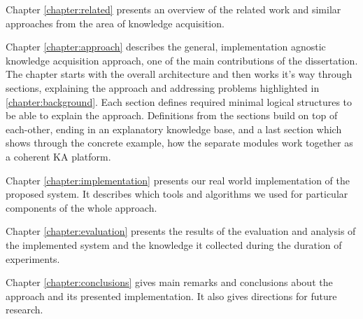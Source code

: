 Chapter \ref{chapter:related} presents an overview of the related work and
similar approaches from the area of knowledge acquisition.

Chapter \ref{chapter:approach} describes the general, implementation agnostic
knowledge acquisition approach, one of the main contributions of the dissertation.
The chapter starts with the overall architecture and then works it's way through
sections, explaining the approach and addressing problems highlighted in
\autoref{chapter:background}. Each section defines required minimal logical
structures to be able to explain the approach. Definitions from the sections
build on top of each-other, ending in an explanatory knowledge base, and
a last section which shows through the concrete example, how the separate 
modules work together as a coherent KA platform.

Chapter \ref{chapter:implementation} presents our real world implementation of 
the proposed system. It describes which tools and algorithms we used for 
particular components of the whole approach.

Chapter \ref{chapter:evaluation} presents the results of the evaluation and
analysis of the implemented system and the knowledge it collected during the
duration of experiments.

Chapter \ref{chapter:conclusions} gives main remarks and conclusions about the
approach and its presented implementation. It also gives directions for future
research.
